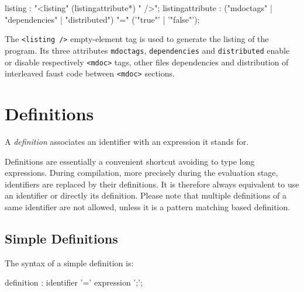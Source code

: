 \documentclass[a4paper,10pt]{book}
\begin{document}
\begin{rail}
listing : "<listing" (listingattribute*) " />";
listingattribute : ("mdoctags" | "dependencies" | "distributed") "=" ('"true"' | '"false"');
\end{rail}



The \lstinline'<listing />' empty-element tag is used to generate the listing of the \faust program. Its three attributes \lstinline'mdoctags', \lstinline'dependencies' and \lstinline'distributed' enable or disable respectively \lstinline'<mdoc>' tags, other files dependencies and distribution of interleaved faust code between \lstinline'<mdoc>' sections.


\section{Definitions}

A \textit{definition} associates an identifier with an expression it stands for. 

Definitions are essentially a convenient shortcut avoiding to type long expressions. During compilation, more precisely during the evaluation stage, identifiers are replaced by their definitions. It is therefore always equivalent to use an identifier or directly its definition. Please note that multiple definitions of a same identifier are not allowed, unless it is a pattern matching based definition.

\subsection{Simple Definitions}

The syntax of a simple definition is:

\begin{rail}
definition  : identifier '=' expression ';';
\end{rail} 
\end{document}
